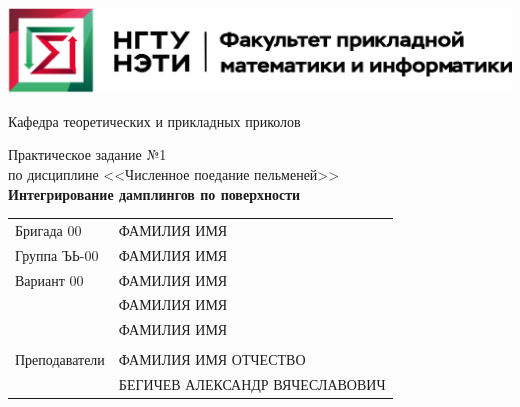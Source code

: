 \documentclass[12pt,a4paper]{article}
\begin{document}
\begin{center}
\begin{large}
\vspace{12mm}




\vspace{4mm}

\includegraphics[scale=0.8]{pic/logo_fami}

\vspace{12mm}


Кафедра теоретических и прикладных приколов

\vspace{4mm}


Практическое задание №1 \\ %
по дисциплине <<Численное поедание пельменей>> \\ %
\bigskip
\textbf{Интегрирование дамплингов по поверхности} %

\vspace{8mm}

\end{large}




\renewcommand{\arraystretch}{1.7}
\begin{tabular}{ll}
Бригада 00				& \uppercase{Фамилия Имя} \\
Группа ЪЬ-00			& \uppercase{Фамилия Имя} \\
Вариант 00				& \uppercase{Фамилия Имя} \\
						& \uppercase{Фамилия Имя} \\
						& \uppercase{Фамилия Имя} \\
						& \\
Преподаватели			& \uppercase{Фамилия Имя Отчество} \\
						& \uppercase{Бегичев Александр Вячеславович} \\
\end{tabular}
\renewcommand{\arraystretch}{1.0}


\end{center}
\end{document}
